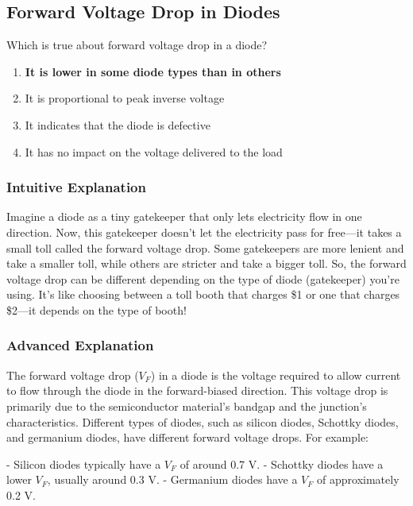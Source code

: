 \subsection{Forward Voltage Drop in Diodes}
\label{T6B01}

\begin{tcolorbox}[colback=gray!10!white,colframe=black!75!black,title=T6B01]
Which is true about forward voltage drop in a diode?
\begin{enumerate}[label=\Alph*)]
    \item \textbf{It is lower in some diode types than in others}
    \item It is proportional to peak inverse voltage
    \item It indicates that the diode is defective
    \item It has no impact on the voltage delivered to the load
\end{enumerate}
\end{tcolorbox}

\subsubsection{Intuitive Explanation}
Imagine a diode as a tiny gatekeeper that only lets electricity flow in one direction. Now, this gatekeeper doesn't let the electricity pass for free—it takes a small toll called the forward voltage drop. Some gatekeepers are more lenient and take a smaller toll, while others are stricter and take a bigger toll. So, the forward voltage drop can be different depending on the type of diode (gatekeeper) you're using. It's like choosing between a toll booth that charges \$1 or one that charges \$2—it depends on the type of booth!

\subsubsection{Advanced Explanation}
The forward voltage drop (\(V_F\)) in a diode is the voltage required to allow current to flow through the diode in the forward-biased direction. This voltage drop is primarily due to the semiconductor material's bandgap and the junction's characteristics. Different types of diodes, such as silicon diodes, Schottky diodes, and germanium diodes, have different forward voltage drops. For example:

- Silicon diodes typically have a \(V_F\) of around 0.7 V.
- Schottky diodes have a lower \(V_F\), usually around 0.3 V.
- Germanium diodes have a \(V_F\) of approximately 0.2 V.

